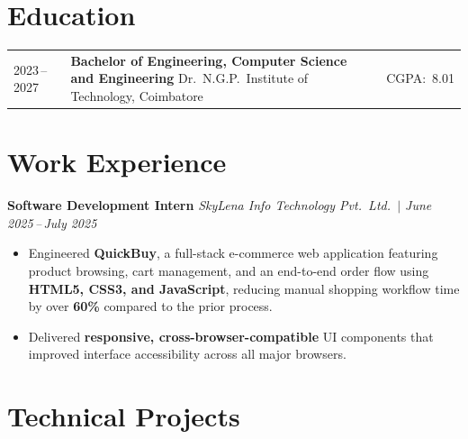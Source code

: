 \documentclass[a4paper,9pt]{article}
\begin{document}
\section{Education}
{\small
\begin{tabularx}{\linewidth}{@{} l X r @{}}
  2023\,--\,2027 &
  \textbf{Bachelor of Engineering, Computer Science and Engineering} \newline
  Dr.\ N.G.P.\ Institute of Technology, Coimbatore
  & CGPA:\ 8.01 \\
\end{tabularx}
}

\section{Work Experience}
{\small
\noindent
\textbf{Software Development Intern} \hfill
\textit{SkyLena Info Technology Pvt.\ Ltd.\ $|$ June 2025\,--\,July 2025}

\begin{itemize}[nosep, leftmargin=1em, itemsep=2pt]
  \item Engineered \textbf{QuickBuy}, a full-stack e-commerce web application featuring
        product browsing, cart management, and an end-to-end order flow using
        \textbf{HTML5, CSS3, and JavaScript}, reducing manual shopping workflow time
        by over \textbf{60\%} compared to the prior process.
  \item Delivered \textbf{responsive, cross-browser-compatible} UI components that improved
        interface accessibility across all major browsers.
\end{itemize}
}

\section{Technical Projects}
\end{document}

